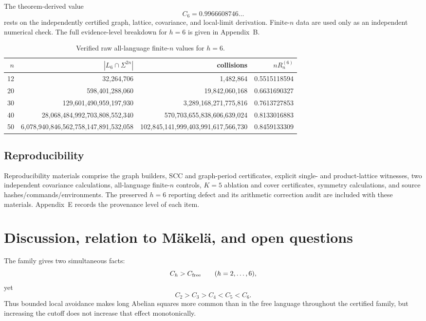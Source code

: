 \documentclass[12pt]{article}
\theoremstyle{definition}
\begin{document}
The theorem-derived value
\[
C_6=0.9966608746\ldots
\]
rests on the independently certified graph, lattice, covariance, and local-limit derivation. Finite-\(n\) data are used only as an independent numerical check. The full evidence-level breakdown for \(h=6\) is given in Appendix~B.

\begin{table}[h]
\centering
\begin{tabular}{rrrr}
\toprule
\(n\) & \(|L_6\cap\Sigma^{2n}|\) & collisions & \(nR_n^{(6)}\) \\
\midrule
12 & 32,264,706 & 1,482,864 & 0.5515118594 \\
20 & 598,401,288,060 & 19,842,060,168 & 0.6631690327 \\
30 & 129,601,490,959,197,930 & 3,289,168,271,775,816 & 0.7613727853 \\
40 & 28,068,484,992,703,808,552,340 & 570,703,655,838,606,639,024 & 0.8133016883 \\
50 & 6,078,940,846,562,758,147,891,532,058 & 102,845,141,999,403,991,617,566,730 & 0.8459133309 \\
\bottomrule
\end{tabular}
\caption{Verified raw all-language finite-\(n\) values for \(h=6\).}
\label{tab:h6}
\end{table}

\subsection*{Reproducibility}

Reproducibility materials comprise the graph builders, SCC and graph-period certificates, explicit single- and product-lattice witnesses, two independent covariance calculations, all-language finite-\(n\) controls, \(K=5\) ablation and cover certificates, symmetry calculations, and source hashes/commands/environments. The preserved \(h=6\) reporting defect and its arithmetic correction audit are included with these materials. Appendix~E records the provenance level of each item.

\section{Discussion, relation to M\"akel\"a, and open questions}
\label{sec:discussion}

The family gives two simultaneous facts:
\[
C_h>C_{\rm free}
\qquad(h=2,\ldots,6),
\]
yet
\[
C_2>C_3>C_4<C_5<C_6.
\]
Thus bounded local avoidance makes long Abelian squares more common than in the free language throughout the certified family, but increasing the cutoff does not increase that effect monotonically.
\end{document}
